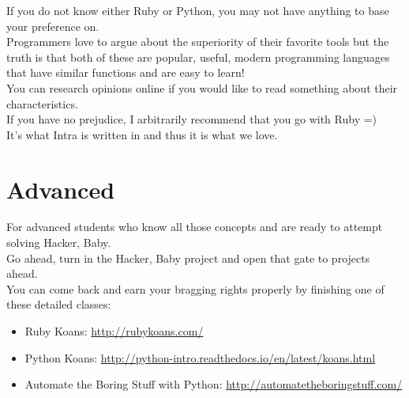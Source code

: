 \documentclass{42-en}
\begin{document}
If you do not know either Ruby or Python, you may not have anything to base your preference on.\\

Programmers love to argue about the superiority of their favorite tools but the truth is that both of these are popular, useful, modern programming languages that have similar functions and are easy to learn!\\

You can research opinions online if you would like to read something about their characteristics.\\

If you have no prejudice, I arbitrarily recommend that you go with Ruby =)\\

It's what Intra is written in and thus it is what we love. 



\chapter{Advanced}

For advanced students who know all those concepts and are ready to attempt solving Hacker, Baby.\\

Go ahead, turn in the Hacker, Baby project and open that gate to projects ahead.\\

You can come back and earn your bragging rights properly by finishing one of these detailed classes:

\begin{itemize}

	\item Ruby Koans: \url{http://rubykoans.com/}
	\item Python Koans: \url{http://python-intro.readthedocs.io/en/latest/koans.html}
	\item Automate the Boring Stuff with Python: \url{http://automatetheboringstuff.com/}

\end{itemize}
\end{document}
